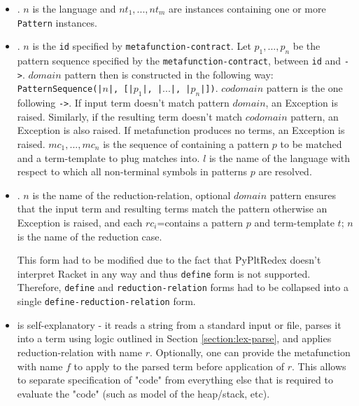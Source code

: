 \begin{itemize}
\item
\TlDefineLanguage. $n$ is the language and $nt_1,...,nt_m$ are \NtDefinitionN \space instances containing one or more \texttt{Pattern} instances.

\item
\TlDefineMetafunction. $n$ is the \texttt{id} specified by \texttt{metafunction-contract}. Let $p_1, ..., p_n$ be the pattern sequence specified by the \texttt{metafunction-contract}, between \texttt{id} and \texttt{->}. $domain$ pattern then is constructed in the following way: \texttt{PatternSequence(|$n$|, [|$p_1$|, |$...$|, |$p_n$|])}. $codomain$ pattern is the one following \texttt{->}. If input term doesn't match pattern $domain$, an Exception is raised. Similarly, if the resulting term doesn't match $codomain$ pattern, an Exception is also raised. If metafunction produces no terms, an Exception is raised. $mc_1,...,mc_n$ is the sequence of \MetafunctionCase containing a pattern $p$ to be matched and a term-template to plug matches into. $l$ is the name of the language with respect to which all non-terminal symbols in patterns $p$ are resolved.

\item \TlDefineReductionRelation. $n$ is the name of the reduction-relation, optional $domain$ pattern ensures that the input term and resulting terms match the pattern otherwise an Exception is raised, and each $rc_i$=\ReductionCase contains a pattern $p$ and term-template $t$; $n$ is the name of the reduction case.

This form had to be modified due to the fact that PyPltRedex doesn't interpret Racket in any way and thus \texttt{define} form is not supported. Therefore, \texttt{define} and \texttt{reduction-relation} forms had to be collapsed into a single \texttt{define-reduction-relation} form.

\item \ReadFromStdinAndApplyReductionRelation \space is self-explanatory -  it reads a string from a standard input or file, parses it into a term using logic outlined in Section \ref{section:lex-parse}, and applies reduction-relation with name $r$. Optionally, one can provide the metafunction with name $f$ to apply to the parsed term before application of $r$. This allows to separate specification of "code" from everything else that is required to evaluate the "code" (such as model of the heap/stack, etc).
\end{itemize}

